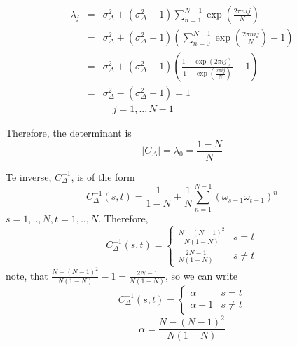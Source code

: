 \documentclass{paper}
\begin{document}
\begin{eqnarray*}
\lambda_j & = & \sigma^2_{\Delta} +(\sigma^2_{\Delta}-1)\sum_{n=1}^{N-1}\exp(\frac{2\pi nij}{N})\\
& = & \sigma^2_{\Delta} +(\sigma^2_{\Delta}-1)\left(\sum_{n=0}^{N-1}\exp(\frac{2\pi nij}{N})-1 \right)\\
 & = &  \sigma^2_{\Delta} +(\sigma^2_{\Delta}-1)\left(\frac{1-\exp(2\pi ij)}{1-\exp(\frac{2\pi ij}{N})}-1 \right)\\
  & =&  \sigma^2_{\Delta} -(\sigma^2_{\Delta}-1) = 1 \\
  && \quad j=1,..,N-1
\end{eqnarray*}

Therefore, the determinant is
\begin{equation*}
|C_\Delta|=\lambda_0=\frac{1-N}{N}
\end{equation*}

Te inverse, $C_\Delta ^{-1}$, is of the form
\begin{equation*}
C_\Delta^{-1}(s,t)=
\frac{1}{1-N}+\frac{1}{N}\sum_{n=1}^{N-1}(\omega_{s-1}\omega_{t-1})^n
\end{equation*}
$s=1,..,N, t=1,..,N$. Therefore,
\begin{equation*}
C^{-1}_\Delta(s,t) = 
\begin{cases}
\frac{N-(N-1)^2}{N(1-N)} & s=t\\
\frac{2N-1}{N(1-N)}      & s\neq t
\end{cases}
\end{equation*}
note, that $\frac{N-(N-1)^2}{N(1-N)}-1 = \frac{2N-1}{N(1-N)} $, so we can write 
\begin{equation*}
C^{-1}_\Delta(s,t) = 
\begin{cases}
\alpha    & s=t\\
\alpha-1  & s\neq t
\end{cases}
\end{equation*}
\begin{equation*}
 \alpha=\frac{N-(N-1)^2}{N(1-N)}
\end{equation*}
 
\end{document}

